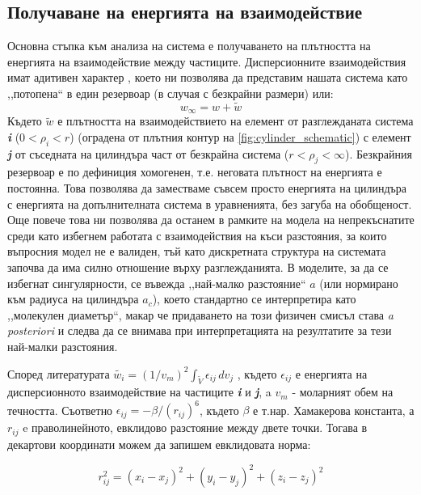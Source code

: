 \subsection{Получаване на енергията на взаимодействие}
Основна стъпка към анализа на система е получаването на плътността на енергията на взаимодействие между частиците. 
Дисперсионните взаимодействия имат адитивен характер \cite{israelachvili}, което ни позволява да представим нашата система като
,,потопена`` в един резервоар (в случая с безкрайни размери) или:
\begin{equation}
	w_{\infty}  = w + \tilde{w}
\end{equation}
Където $\tilde{w}$ е плътността на взаимодействието на елемент от разглежданата система \textbf{\textit{i}} ($0 < \rho_{i} < r$) (оградена от плътния контур на \autoref{fig:cylinder_schematic}) с елемент \textbf{\textit{j}} от съседната на цилиндъра част от безкрайна система ($r < \rho_{j} <  \infty$).
Безкрайния резервоар е по дефиниция хомогенен, т.е. неговата плътност на енергията е постоянна. Това позволява да заместваме съвсем просто енергията на цилиндъра с енергията на допълнителната система в уравненията, без загуба на обобщеност.
Още повече това ни позволява да останем в рамките на модела на непрекъснатите среди като избегнем работата с взаимодействия на къси разстояния, за които въпросния модел не е валиден, тъй като дискретната структура на системата започва да има силно отношение върху разглежданията.
В моделите, за да се избегнат сингулярности, се въвежда ,,най-малко разстояние`` $a$ (или нормирано към радиуса на цилиндъра $a_{c}$),
което стандартно се интерпретира като ,,молекулен диаметър``, макар че придаването на този физичен смисъл става \textit{a posteriori} \cite{israelachvili} и следва да се внимава 
при интерпретацията на резултатите за тези най-малки разстояния.


Според литературата  $\tilde{w_{i}} = (1/v_{m})^2 \int_{\tilde{V}}\epsilon_{ij}\,dv_{j}$ \cite{israelachvili}, където $\epsilon_{ij}$ е енергията на дисперсионното взаимодействие на частиците \textbf{\textit{i}} и \textbf{\textit{j}}, a $v_{m}$ - моларният обем на течността.
Съответно $\epsilon_{ij} = -\beta/(r_{ij})^6$, където $\beta$ е т.нар. Хамакерова константа, а $r_{ij}$ e праволинейното, евклидово разстояние между двете точки.
Тогава в декартови координати можем да запишем евклидовата норма:

\begin{equation}
	r_{ij}^2 = (x_{i} - x_{j})^2  + (y_{i} - y_{j})^2 + (z_{i}-z_{j})^2
	\label{eq:cartesian}
\end{equation}

